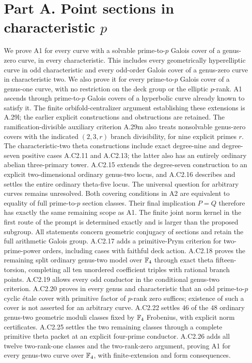 \section{Part A. Point sections in characteristic \texorpdfstring{$p$}{p}}
\label{sec:partA}

We prove A1 for every curve with a solvable prime-to-$p$ Galois
cover of a genus-zero curve, in every characteristic. This includes
every geometrically hyperelliptic curve in odd characteristic and
every odd-order Galois cover of a genus-zero curve in characteristic
two. We also prove it for every prime-to-$p$ Galois cover of a
genus-one curve, with no restriction on the deck group or the
elliptic $p$-rank. A1 ascends through prime-to-$p$ Galois covers
of a hyperbolic curve already known to satisfy it. The finite
orbifold-centralizer argument establishing these extensions is
A.29l; the earlier explicit constructions and obstructions are
retained. The ramification-divisible auxiliary criterion A.29m
also treats nonsolvable genus-zero covers with the indicated
$(2,3,r)$ branch divisibility, for nine explicit primes $r$.
The characteristic-two theta constructions include exact degree-nine
and degree-seven positive cases A.C2.11 and A.C2.13; the latter
also has an entirely ordinary abelian three-primary tower.
A.C2.15 extends the degree-seven construction to an explicit
two-dimensional ordinary genus-two locus, and A.C2.16 describes
and settles the entire ordinary theta-five locus.
The universal question for arbitrary curves remains
unresolved. Both covering conditions in A2 are
equivalent to equality of full prime-to-$p$ section classes. Their final
implication $P=Q$ therefore has exactly the same remaining scope as A1.
The finite joint norm kernel in the first route of the prompt is
determined exactly and is larger than the proposed subgroup. All
statements concern geometric conjugacy of sections and retain the full
arithmetic Galois group.
A.C2.17 adds a primitive-Prym criterion for two-prime-power orders,
including cases with faithful deck action. A.C2.18 proves the remaining
split ordinary genus-two model over $\mathbb F_4$ through exact theta fifteen-torsion,
completing all ten unordered coefficient triples with rational branch points.
A.C2.19 allows every odd conductor in the conditional genus-two criterion.
A.C2.20 proves in every genus and characteristic that an odd prime-to-$p$
cyclic \'etale cover with primitive factor of $p$-rank zero suffices;
existence of such a cover is not asserted for an arbitrary curve.
A.C2.22 settles $46$ of the $48$ ordinary genus-two geometric moduli
classes fixed by $\mathbb F_4$ Frobenius, with explicit norm certificates.
A.C2.25 settles the two remaining classes through a complete
primitive theta packet at an explicit four-prime conductor.
A.C2.26 adds all twelve two-rank-one classes and the
two-rank-zero argument, proving A1 for every genus-two
curve over $\mathbb F_4$, with finite-extension and form consequences.

